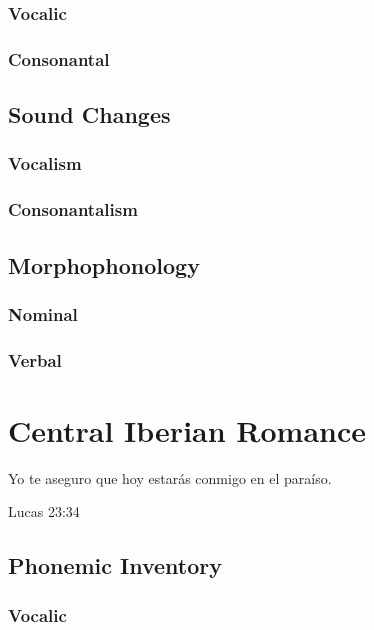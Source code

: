 \documentclass{report}
\begin{document}
\subsection{Vocalic}

\subsection{Consonantal}

\section{Sound Changes}

\subsection{Vocalism}

\subsection{Consonantalism}

\section{Morphophonology}

\subsection{Nominal}

\subsection{Verbal}

\chapter{Central Iberian Romance}

\epigraph{Yo te aseguro que hoy estarás conmigo en el paraíso.}{Lucas 23:34}

\section{Phonemic Inventory}

\subsection{Vocalic}
\end{document}
